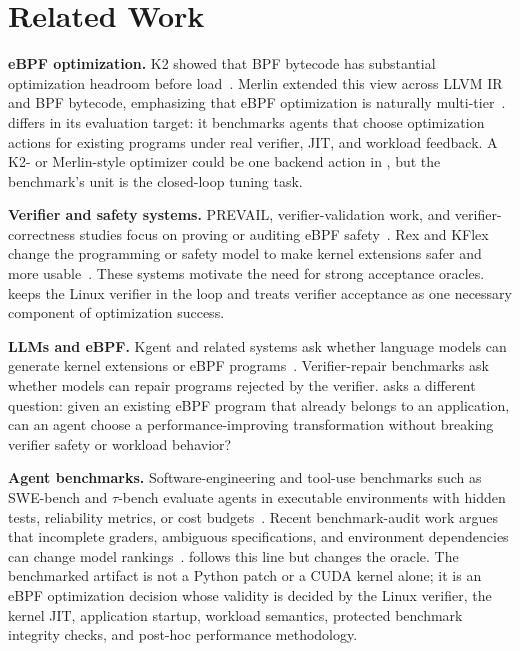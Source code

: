 \section{Related Work}
\label{sec:related-work}

\noindent\textbf{eBPF optimization.} K2 showed that BPF bytecode has substantial optimization headroom before load~\cite{xu2021synthesizing}. Merlin extended this view across LLVM IR and BPF bytecode, emphasizing that eBPF optimization is naturally multi-tier~\cite{mao2024merlin}. \sys differs in its evaluation target: it benchmarks agents that choose optimization actions for existing programs under real verifier, JIT, and workload feedback. A K2- or Merlin-style optimizer could be one backend action in \sys, but the benchmark's unit is the closed-loop tuning task.

\noindent\textbf{Verifier and safety systems.} PREVAIL, verifier-validation work, and verifier-correctness studies focus on proving or auditing eBPF safety~\cite{gershuni2019simple,sun2024validating,vishwanathan2023verifying}. Rex and KFlex change the programming or safety model to make kernel extensions safer and more usable~\cite{jia2025rex,dwivedi2024fast}. These systems motivate the need for strong acceptance oracles. \sys keeps the Linux verifier in the loop and treats verifier acceptance as one necessary component of optimization success.

\noindent\textbf{LLMs and eBPF.} Kgent and related systems ask whether language models can generate kernel extensions or eBPF programs~\cite{zheng2024kgent}. Verifier-repair benchmarks ask whether models can repair programs rejected by the verifier. \sys asks a different question: given an existing eBPF program that already belongs to an application, can an agent choose a performance-improving transformation without breaking verifier safety or workload behavior?

\noindent\textbf{Agent benchmarks.} Software-engineering and tool-use benchmarks such as SWE-bench and \(\tau\)-bench evaluate agents in executable environments with hidden tests, reliability metrics, or cost budgets~\cite{swebench2023,taubench2024}. Recent benchmark-audit work argues that incomplete graders, ambiguous specifications, and environment dependencies can change model rankings~\cite{swebenchsolved2025,benchmarkaudit2026}. \sys follows this line but changes the oracle. The benchmarked artifact is not a Python patch or a CUDA kernel alone; it is an eBPF optimization decision whose validity is decided by the Linux verifier, the kernel JIT, application startup, workload semantics, protected benchmark integrity checks, and post-hoc performance methodology.
